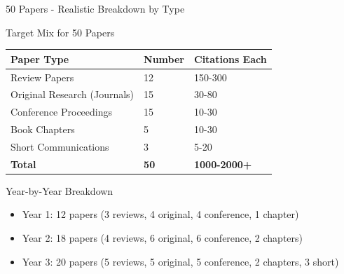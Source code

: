 \documentclass[11pt]{beamer}
\begin{document}
	\begin{frame}{50 Papers - Realistic Breakdown by Type}
		\scriptsize
		\begin{block}{Target Mix for 50 Papers}
			\centering
			\begin{tabular}{|p{4cm}|p{3cm}|p{3cm}|}
				\hline
				\textbf{Paper Type} & \textbf{Number} & \textbf{Citations Each} \\
				\hline
				Review Papers & 12 & 150-300 \\
				\hline
				Original Research (Journals) & 15 & 30-80 \\
				\hline
				Conference Proceedings & 15 & 10-30 \\
				\hline
				Book Chapters & 5 & 10-30 \\
				\hline
				Short Communications & 3 & 5-20 \\
				\hline
				\textbf{Total} & \textbf{50} & \textbf{1000-2000+} \\
				\hline
			\end{tabular}
		\end{block}
		\begin{block}{Year-by-Year Breakdown}
			\begin{itemize}
				\item Year 1: 12 papers (3 reviews, 4 original, 4 conference, 1 chapter)
				\item Year 2: 18 papers (4 reviews, 6 original, 6 conference, 2 chapters)
				\item Year 3: 20 papers (5 reviews, 5 original, 5 conference, 2 chapters, 3 short)
			\end{itemize}
		\end{block}
	\end{frame}
	
\end{document}
